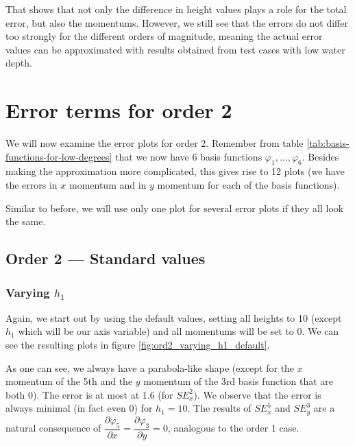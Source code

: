 \documentclass[a4paper, twoside]{article}
\newcommand{\pd}[2]{\dfrac{\partial #1}{\partial #2}}
\renewcommand{\phi}{\varphi}
\begin{document}
That shows that not only the difference in height values plays a role for the total error, but also the momentums. However, we still see that the errors do not differ too strongly for the different orders of magnitude, meaning the actual error values can be approximated with results obtained from test cases with low water depth.

\clearpage{}

\section{Error terms for order 2}
\label{sec:stiffness-analyis-ord-2}

We will now examine the error plots for order 2. Remember from table \ref{tab:basis-functions-for-low-degrees} that we now have 6 basis functions $\phi_1,\dots,\phi_6$. Besides making the approximation more complicated, this gives rise to 12 plots (we have the errors in $x$ momentum and in $y$ momentum for each of the basis functions).

Similar to before, we will use only one plot for several error plots if they all look the same.

\subsection{Order 2 --- Standard values}
\label{sec:stiffness-analyiss-ord2-default}

\subsubsection{\texorpdfstring{Varying $h_1$}{Varying h1}}
\label{sec:stiffness-analysis-ord2-default-var-h1}

Again, we start out by using the default values, setting all heights to 10 (except $h_1$ which will be our axis variable) and all momentums will be set to 0. We can see the resulting plots in figure \ref{fig:ord2_varying_h1_default}.



As one can see, we always have a parabola-like shape (except for the $x$ momentum of the 5th and the $y$ momentum of the 3rd basis function that are both 0). The error is at most at 1.6 (for $SE_x^2$). We observe that the error is always minimal (in fact even 0) for $h_1=10$. The results of $SE_x^5$ and $SE_y^3$ are a natural consequence of $\pd{\phi_5}{x}=\pd{\phi_3}{y}=0$, analogous to the order 1 case.
\end{document}
